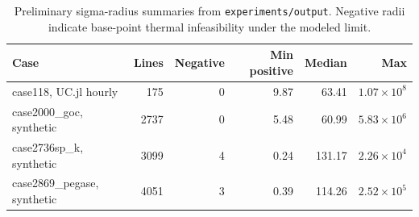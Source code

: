 \begin{table}[t]
\centering
\caption{Preliminary sigma-radius summaries from \texttt{experiments/output}. Negative radii indicate base-point thermal infeasibility under the modeled limit.\label{tab:sigma}}
\footnotesize
\begin{tabularx}{\textwidth}{@{}Xrrrrr@{}}
\toprule
Case & Lines & Negative & Min positive & Median & Max \\
\midrule
case118, UC.jl hourly & 175 & 0 & 9.87 & 63.41 & $1.07\times 10^8$ \\
case2000\_goc, synthetic & 2737 & 0 & 5.48 & 60.99 & $5.83\times 10^6$ \\
case2736sp\_k, synthetic & 3099 & 4 & 0.24 & 131.17 & $2.26\times 10^4$ \\
case2869\_pegase, synthetic & 4051 & 3 & 0.39 & 114.26 & $2.52\times 10^5$ \\
\bottomrule
\end{tabularx}
\end{table}
